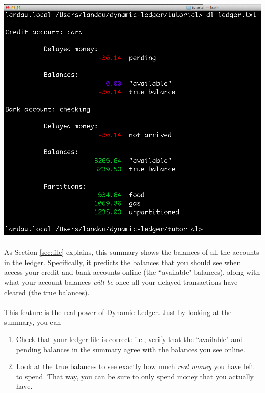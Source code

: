 \documentclass{article}
\begin{document}
\begin{flushleft}
\begin{center}
\includegraphics[scale=.45]{fig/usage0.png}
\end{center} 

\paragraph{} As Section \ref{sec:file} explains, this summary shows the balances of all the accounts in the ledger. Specifically, it predicts the balances that you should see when access your credit and bank accounts online (the ``available" balances), along with what your account balances \emph{will be} once all your delayed transactions have cleared (the true balances). 

\paragraph{} This feature is the real power of Dynamic Ledger. Just by looking at the summary, you can

\begin{enumerate}
\item Check that your ledger file is correct: i.e., verify that the ``available" and pending balances in the summary agree with the balances you see online.
\item Look at the true balances to see exactly how much \emph{real money} you have left to spend. That way, you can be sure to only spend money that you actually have.
\end{enumerate}


\end{flushleft}
\end{document}
